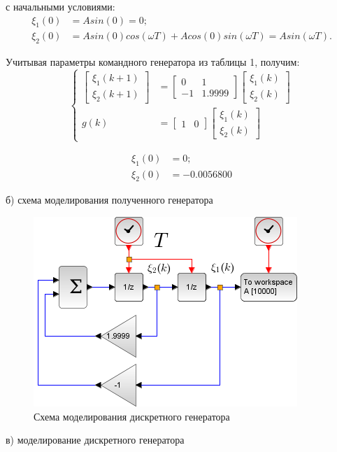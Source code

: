 \documentclass[a4paper,14pt]{extreport}
\begin{document}
с начальными условиями:
\begin{align}
	\xi_1(0) &= A sin(0) = 0;\\
	\xi_2(0) &= A sin(0) cos(\omega T) + A cos(0) sin(\omega T) = A  sin(\omega T).
\end{align}

Учитывая параметры командного генератора из таблицы 1, получим:
\begin{equation}
\begin{cases}
\begin{bmatrix}
\xi_1(k+1) \\
\xi_2(k+1)
\end{bmatrix}
&=\begin{bmatrix}
0&1\\
-1& 1.9999
\end{bmatrix}
\begin{bmatrix}
\xi_1(k)\\
\xi_2(k)
\end{bmatrix}
\\
g(k) &= \begin{bmatrix}
1& 0
\end{bmatrix}
\begin{bmatrix}
\xi_1(k)\\
\xi_2(k)
\end{bmatrix}
\end{cases}
\end{equation}

\begin{align}
\xi_1(0) &= 0;\\
\xi_2(0) &= -0.0056800
\end{align}

б) схема моделирования полученного генератора

\begin{figure}[H]
	\center\includegraphics[width=0.5\linewidth]{a.png}
	\caption{Схема моделирования дискретного генератора}
	\label{fig:scr1}
\end{figure}

в) моделирование дискретного генератора
\end{document}
